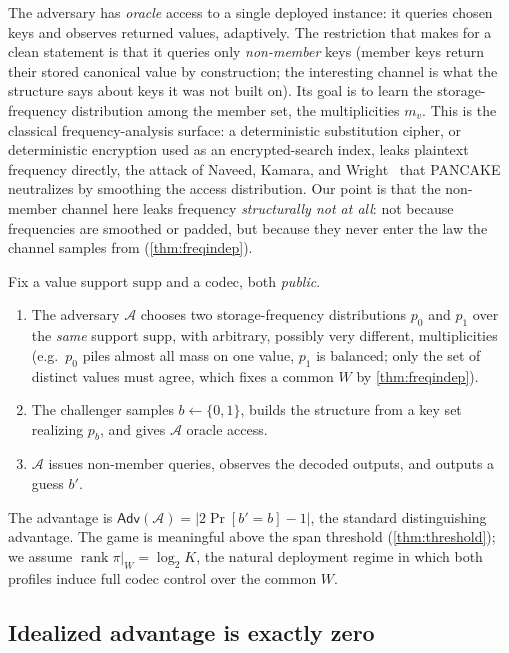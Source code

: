 \documentclass[sigconf,nonacm,anonymous,balance=false]{acmart}
\DeclareMathOperator{\rank}{rank}
\newcommand{\W}{W}                          %
\newcommand{\proj}{\pi}                     %
\newcommand{\supp}{\mathrm{supp}}           %
\newcommand{\Adv}{\mathsf{Adv}}             %
\begin{document}
The adversary has \emph{oracle} access to a single deployed instance: it queries chosen
keys and observes returned values, adaptively. The restriction that makes for a clean
statement is that it queries only \emph{non-member} keys (member keys return their stored
canonical value by construction; the interesting channel is what the structure says about
keys it was not built on). Its goal is to learn the storage-frequency distribution among
the member set, the multiplicities $m_v$. This is the classical frequency-analysis
surface: a deterministic substitution cipher, or deterministic encryption used as an
encrypted-search index, leaks plaintext frequency directly, the attack of Naveed, Kamara,
and Wright~\cite{naveed2015inference} that PANCAKE~\cite{grubbs2020pancake} neutralizes
by smoothing the access distribution. Our point is that the non-member channel here leaks
frequency \emph{structurally not at all}: not because frequencies are smoothed or padded,
but because they never enter the law the channel samples from (\cref{thm:freqindep}).

\begin{definition}
\label{def:freqdist}
Fix a value support $\supp$ and a codec, both \emph{public}.
\begin{enumerate}
  \item The adversary $\mathcal{A}$ chooses two storage-frequency distributions $p_0$
  and $p_1$ over the \emph{same} support $\supp$, with arbitrary, possibly very
  different, multiplicities (e.g.\ $p_0$ piles almost all mass on one value, $p_1$ is
  balanced; only the set of distinct values must agree, which fixes a common $\W$ by
  \cref{thm:freqindep}).
  \item The challenger samples $b \leftarrow \{0,1\}$, builds the structure from a key
  set realizing $p_b$, and gives $\mathcal{A}$ oracle access.
  \item $\mathcal{A}$ issues non-member queries, observes the decoded outputs, and outputs
  a guess $b'$.
\end{enumerate}
The advantage is $\Adv(\mathcal{A}) = |2\Pr[b' = b] - 1|$, the standard distinguishing
advantage. The game is meaningful above the span threshold (\cref{thm:threshold}); we
assume $\rank \proj|_{\W} = \log_2 K$, the natural deployment regime in which both
profiles induce full codec control over the common $\W$.
\end{definition}

\subsection{Idealized advantage is exactly zero}
\end{document}
